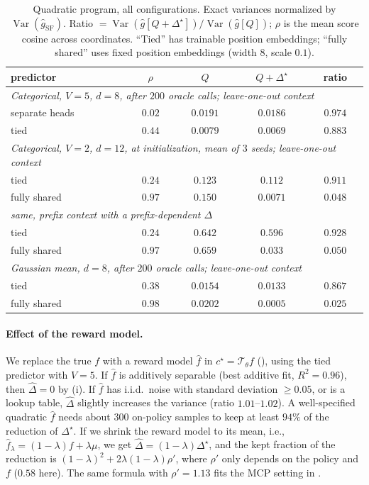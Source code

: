 \documentclass[10pt]{article}
\providecommand{\Var}{\operatorname{Var}}
\theoremstyle{plain}
\theoremstyle{definition}
\theoremstyle{remark}
\theoremstyle{definition}
\newcommand{\ghat}[1]{\hat g[#1]}            %
\newcommand{\rf}{\hat g_{\mathrm{SF}}}       %
\newcommand{\Dstar}{\Delta^{\star}}
\newcommand{\cstar}{c^{\star}}
\begin{document}
\begin{table}[h]
\centering\small
\caption{Quadratic program, all configurations. Exact variances normalized by $\Var(\rf)$. Ratio $=\Var(\ghat{Q+\Dstar})/\Var(\ghat{Q})$; $\rho$ is the mean score cosine across coordinates. ``Tied'' has trainable position embeddings; ``fully shared'' uses fixed position embeddings (width $8$, scale $0.1$).}
\label{tab:toy-full}
\begin{tabular}{lcccc}
\toprule
predictor & $\rho$ & $Q$ & $Q{+}\Dstar$ & ratio \\
\midrule
\multicolumn{5}{l}{\emph{Categorical, $V{=}5$, $d{=}8$, after $200$ oracle calls; leave-one-out context}} \\
\quad separate heads & $0.02$ & $0.0191$ & $0.0186$ & $0.974$ \\
\quad tied & $0.44$ & $0.0079$ & $0.0069$ & $0.883$ \\
\multicolumn{5}{l}{\emph{Categorical, $V{=}2$, $d{=}12$, at initialization, mean of $3$ seeds; leave-one-out context}} \\
\quad tied & $0.24$ & $0.123$ & $0.112$ & $0.911$ \\
\quad fully shared & $0.97$ & $0.150$ & $0.0071$ & $0.048$ \\
\multicolumn{5}{l}{\emph{same, prefix context with a prefix-dependent $\Delta$}} \\
\quad tied & $0.24$ & $0.642$ & $0.596$ & $0.928$ \\
\quad fully shared & $0.97$ & $0.659$ & $0.033$ & $0.050$ \\
\multicolumn{5}{l}{\emph{Gaussian mean, $d{=}8$, after $200$ oracle calls; leave-one-out context}} \\
\quad tied & $0.38$ & $0.0154$ & $0.0133$ & $0.867$ \\
\quad fully shared & $0.98$ & $0.0202$ & $0.0005$ & $0.025$ \\
\bottomrule
\end{tabular}
\end{table}

\paragraph{Effect of the reward model.} We replace the true $f$ with a reward model $\hat f$ in $\cstar=\mathcal T_\theta f$ (), using the tied predictor with $V=5$. If $\hat f$ is additively separable (best additive fit, $R^2=0.96$), then $\hat\Delta=0$ by (i). If $\hat f$ has i.i.d.\ noise with standard deviation $\ge0.05$, or is a lookup table, $\hat\Delta$ slightly increases the variance (ratio $1.01$--$1.02$). A well-specified quadratic $\hat f$ needs about $300$ on-policy samples to keep at least $94\%$ of the reduction of $\Dstar$. If we shrink the reward model to its mean, i.e., $\hat f_\lambda=(1-\lambda)f+\lambda\mu$, we get $\hat\Delta=(1-\lambda)\Dstar$, and the kept fraction of the reduction is $(1-\lambda)^2+2\lambda(1-\lambda)\rho'$, where $\rho'$ only depends on the policy and $f$ ($0.58$ here). The same formula with $\rho'=1.13$ fits the MCP setting in .
\end{document}
